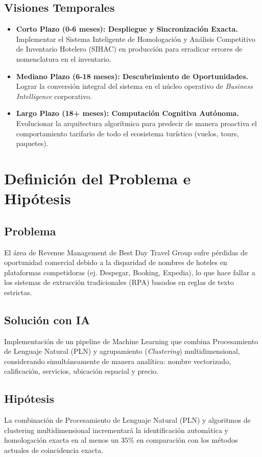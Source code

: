 \documentclass[11pt,a4paper]{article}
\begin{document}
\subsection{Visiones Temporales}
\begin{itemize}[leftmargin=*]
    \item \textbf{Corto Plazo (0-6 meses): Despliegue y Sincronización Exacta.} Implementar el Sistema Inteligente de Homologación y Análisis Competitivo de Inventario Hotelero (SIHAC) en producción para erradicar errores de nomenclatura en el inventario.
    \item \textbf{Mediano Plazo (6-18 meses): Descubrimiento de Oportunidades.} Lograr la conversión integral del sistema en el núcleo operativo de \textit{Business Intelligence} corporativo.
    \item \textbf{Largo Plazo (18+ meses): Computación Cognitiva Autónoma.} Evolucionar la arquitectura algorítmica para predecir de manera proactiva el comportamiento tarifario de todo el ecosistema turístico (vuelos, tours, paquetes).
\end{itemize}

\section{Definición del Problema e Hipótesis}
\subsection{Problema}
El área de Revenue Management de Best Day Travel Group sufre pérdidas de oportunidad comercial debido a la disparidad de nombres de hoteles en plataformas competidoras (ej. Despegar, Booking, Expedia), lo que hace fallar a los sistemas de extracción tradicionales (RPA) basados en reglas de texto estrictas.

\subsection{Solución con IA}
Implementación de un pipeline de Machine Learning que combina Procesamiento de Lenguaje Natural (PLN) y agrupamiento (\textit{Clustering}) multidimensional, considerando simultáneamente de manera analítica: nombre vectorizado, calificación, servicios, ubicación espacial y precio.

\subsection{Hipótesis}
La combinación de Procesamiento de Lenguaje Natural (PLN) y algoritmos de clustering multidimensional incrementará la identificación automática y homologación exacta en al menos un $35\%$ en comparación con los métodos actuales de coincidencia exacta.
\end{document}
